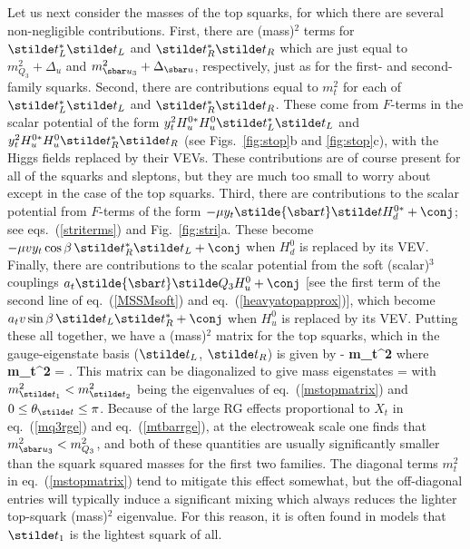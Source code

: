 Let us next consider the masses of the top squarks, for which there are
several non-negligible
contributions. First, there are (mass)$^2$ terms for
$\stilde t^*_L \stilde t_L$ and $\stilde t_R^* \stilde t_R$
which are just equal to $m^2_{Q_3} + \Delta_u$ and $m^2_{\sbar u_3} +
\Delta_{\sbar u}$, respectively, just as for the first- and second-family
squarks. Second, there are contributions equal to $m_t^2$ for
each of $\stilde t^*_L \stilde t_L$ and $\stilde t_R^* \stilde t_R$.
These come from $F$-terms in the scalar potential of the form $y_t^2
H_u^{0*}
H_u^0 \stilde t_L^* \stilde t_L$ and
$y_t^2 H_u^{0*}
H_u^0 \stilde t_R^* \stilde t_R$ (see Figs.~\ref{fig:stop}b and
\ref{fig:stop}c), with
the Higgs
fields replaced by their VEVs. These contributions are of course
present for all of the squarks and sleptons, but they are much too small
to worry about except in the case of the top squarks. Third, there are
contributions to the scalar potential from $F$-terms
of the form $-\mu y_t \stilde{\sbar t} \stilde t H_d^{0*}
+\conj$; see eqs.~(\ref{striterms}) and Fig.~\ref{fig:stri}a. These
become $-\mu v y_t \cos\beta\, \stilde t^*_R \stilde t_L + 
\conj$ when $H_d^0$ is replaced by its VEV.
Finally, there are contributions to the scalar potential from the
soft (scalar)$^3$ couplings $a_t
\stilde{\sbar t}
\stilde Q_3 H_u^0
+ \conj$ [see the first term of the second line of
eq.~(\ref{MSSMsoft}) and eq.~(\ref{heavyatopapprox})], which become $
a_t v \sin\beta\, \stilde t_L \stilde t_R^* + \conj$ when $H_u^0$
is replaced by its VEV. Putting
these all together,
we have a (mass)$^2$ matrix for the top squarks,
which in the
gauge-eigenstate
basis ($\stilde t_L$, $\stilde t_R$) is given by
\beq
-\lagr \supset {}
{\bf m_{\stilde t}^2} 
\eeq
where
\beq
{\bf m_{\stilde t}^2} =
 .
\label{mstopmatrix}
\eeq
This matrix can be diagonalized to give mass eigenstates
\beq
{} =
\label{pixies}
\eeq
with $m^2_{\stilde t_1}< m^2_{\stilde t_2}$
being the eigenvalues of eq.~(\ref{mstopmatrix})
and $0\leq \theta_{\stilde t} \leq \pi$.
Because of the large RG effects proportional
to $X_t$ in eq.~(\ref{mq3rge}) and eq.~(\ref{mtbarrge}),
at the electroweak
scale one
finds that $m_{\sbar u_3}^2 < m_{Q_3}^2$,
and
both of these quantities are usually significantly smaller
than the squark squared masses for the first two families.
The diagonal terms $m_t^2$ in eq.~(\ref{mstopmatrix}) tend to
mitigate this effect somewhat, but the off-diagonal entries will
typically induce a significant mixing which always reduces
the lighter top-squark (mass)$^2$ eigenvalue. For this reason, it is often
found
in models that $\stilde t_1$ is the lightest squark of all.

